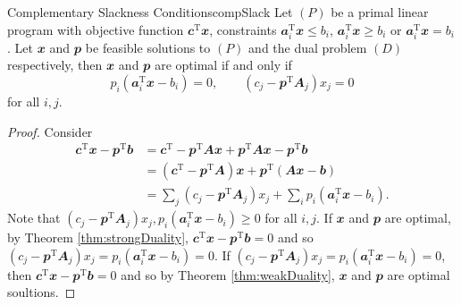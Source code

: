 \documentclass[math, code]{amznotes}
\theoremstyle{remark}
\begin{document}
\begin{thmbox}{Complementary Slackness Conditions}{compSlack}
    Let $(P)$ be a primal linear program with objective function $\mathbfit{c}^{\mathrm{T}}\mathbfit{x}$, constraints $\mathbfit{a}_i^{\mathrm{T}}\mathbfit{x} \leq b_i$, $\mathbfit{a}_i^{\mathrm{T}}\mathbfit{x} \geq b_i$ or $\mathbfit{a}_i^{\mathrm{T}}\mathbfit{x} = b_i$. Let $\mathbfit{x}$ and $\mathbfit{p}$ be feasible solutions to $(P)$ and the dual problem $(D)$ respectively, then $\mathbfit{x}$ and $\mathbfit{p}$ are optimal if and only if 
    \begin{equation*}
        p_i\left(\mathbfit{a}_i^{\mathrm{T}}\mathbfit{x} - b_i\right) = 0, \qquad \left(c_j - \mathbfit{p}^{\mathrm{T}}\mathbfit{A}_j\right)x_j = 0
    \end{equation*}
    for all $i, j$.
    \tcblower
    \begin{proof}
        Consider 
        \begin{align*}
            \mathbfit{c}^{\mathrm{T}}\mathbfit{x} - \mathbfit{p}^{\mathrm{T}}\mathbfit{b} & = \mathbfit{c}^{\mathrm{T}} - \mathbfit{p}^{\mathrm{T}}\mathbfit{Ax} + \mathbfit{p}^{\mathrm{T}}\mathbfit{Ax} - \mathbfit{p}^{\mathrm{T}}\mathbfit{b} \\
            & = \left(\mathbfit{c}^{\mathrm{T}} - \mathbfit{p}^{\mathrm{T}}\mathbfit{A}\right)\mathbfit{x} + \mathbfit{p}^{\mathrm{T}}\left(\mathbfit{Ax} - \mathbfit{b}\right) \\
            & = \sum_{j}\left(c_j - \mathbfit{p}^{\mathrm{T}}\mathbfit{A}_j\right)x_j + \sum_{i}p_i\left(\mathbfit{a}_i^{\mathrm{T}}\mathbfit{x} - b_i\right).
        \end{align*}
        Note that $\left(c_j - \mathbfit{p}^{\mathrm{T}}\mathbfit{A}_j\right)x_j, p_i\left(\mathbfit{a}_i^{\mathrm{T}}\mathbfit{x} - b_i\right) \geq 0$ for all $i, j$. If $\mathbfit{x}$ and $\mathbfit{p}$ are optimal, by Theorem \ref{thm:strongDuality}, $\mathbfit{c}^{\mathrm{T}}\mathbfit{x} - \mathbfit{p}^{\mathrm{T}}\mathbfit{b} = 0$ and so $\left(c_j - \mathbfit{p}^{\mathrm{T}}\mathbfit{A}_j\right)x_j = p_i\left(\mathbfit{a}_i^{\mathrm{T}}\mathbfit{x} - b_i\right) = 0$. If $\left(c_j - \mathbfit{p}^{\mathrm{T}}\mathbfit{A}_j\right)x_j = p_i\left(\mathbfit{a}_i^{\mathrm{T}}\mathbfit{x} - b_i\right) = 0$, then $\mathbfit{c}^{\mathrm{T}}\mathbfit{x} - \mathbfit{p}^{\mathrm{T}}\mathbfit{b} = 0$ and so by Theorem \ref{thm:weakDuality}, $\mathbfit{x}$ and $\mathbfit{p}$ are optimal soultions.
    \end{proof}
\end{thmbox}
\end{document}
